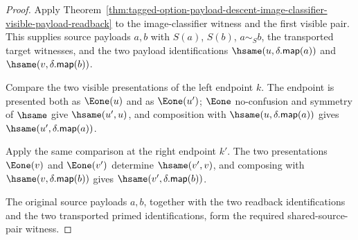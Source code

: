 \begin{proof}
Apply
Theorem~\ref{thm:tagged-option-payload-descent-image-classifier-visible-payload-readback}
to the image-classifier witness and the first visible pair. This supplies
source payloads $a,b$ with $S(a)$, $S(b)$, $a\sim_S b$, the transported target
witnesses, and the two payload identifications
$\hsame(u,\delta.\mathsf{map}(a))$ and
$\hsame(v,\delta.\mathsf{map}(b))$.

Compare the two visible presentations of the left endpoint $k$. The endpoint is
presented both as $\Eone(u)$ and as $\Eone(u')$; $\Eone$ no-confusion and
symmetry of $\hsame$ give $\hsame(u',u)$, and composition with
$\hsame(u,\delta.\mathsf{map}(a))$ gives
$\hsame(u',\delta.\mathsf{map}(a))$.

Apply the same comparison at the right endpoint $k'$. The two presentations
$\Eone(v)$ and $\Eone(v')$ determine $\hsame(v',v)$, and composing with
$\hsame(v,\delta.\mathsf{map}(b))$ gives
$\hsame(v',\delta.\mathsf{map}(b))$.

The original source payloads $a,b$, together with the two readback
identifications and the two transported primed identifications, form the
required shared-source-pair witness.
\end{proof}

